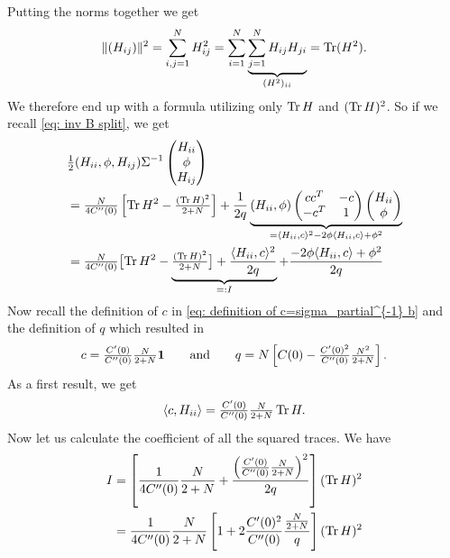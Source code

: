 Putting the norms together we get
\begin{align*}
	\|(H_{ij})\|^2 = \sum_{i,j=1}^N H_{ij}^2
	= \sum_{i=1}^N \underbrace{\sum_{j=1}^N H_{ij}H_{ji}}_{(H^2)_{ii}}
	= \operatorname{Tr}(H^2).
\end{align*}
We therefore end up with a formula utilizing only \(\operatorname{Tr} H\) and \((\operatorname{Tr} H)^2\).
So if we recall \eqref{eq: inv B split}, we get
\begin{align*}
		&\tfrac12
		( H_{ii},\phi, H_{ij} )\Sigma^{-1}
		\begin{pmatrix}
			H_{ii}\\
			\phi\\
			H_{ij}
		\end{pmatrix}\\
		&= \tfrac{N}{4C''(0)}\left[
			\operatorname{Tr} H^2 - \tfrac{(\operatorname{Tr} H)^2}{2+N}
		\right]
		+ \frac1{2q} \underbrace{
			(H_{ii}, \phi)\begin{pmatrix}
			cc^T & -c\\
			-c^T & 1
		\end{pmatrix}
		\begin{pmatrix}
			H_{ii}\\ \phi
		\end{pmatrix}
		}_{
			= \langle H_{ii}, c\rangle^2 - 2\phi \langle H_{ii}, c\rangle + \phi^2
		}\\
		&= \tfrac{N}{4C''(0)}\bigl[
			\operatorname{Tr} H^2 - \underbrace{
				\tfrac{(\operatorname{Tr} H)^2}{2+N}
				\bigr]
				+ \frac{\langle H_{ii}, c\rangle^2}{2q}
			}_{=:I}
		 	+ \frac{- 2\phi \langle H_{ii}, c\rangle + \phi^2}{2q}
\end{align*}
Now recall the definition of \(c\) in \eqref{eq: definition of
c=sigma_partial^{-1} b} and the definition of \(q\) which resulted in
\[
	c=\tfrac{C'(0)}{C''(0)}\tfrac{N}{2+N}\mathbf{1}
	\qquad \text{and} \qquad
	q=N\left[
		C(0) - \tfrac{C'(0)^2}{C''(0)}
		\tfrac{N^2}{2+N}
	\right].
\]
As a first result, we get
\[
	\langle c, H_{ii}\rangle = 
	\tfrac{C'(0)}{C''(0)}\tfrac{N}{2+N}\operatorname{Tr} H.
\]
Now let us calculate the coefficient of all the squared traces. We have
\begin{align*}
	I &= \left[
		\frac{1}{4C''(0)}\frac{N}{2+N} + 
		\frac{
			\left(\tfrac{C'(0)}{C''(0)}\tfrac{N}{2+N}\right)^2
		}{2q}
	\right](\operatorname{Tr} H)^2\\
	&= \frac{1}{4C''(0)}
	\frac{N}{2+N}
	\left[ 1 +
		2\frac{C'(0)^2}{C''(0)}\frac{\frac{N}{2+N}}{q}
	\right](\operatorname{Tr} H)^2
\end{align*}